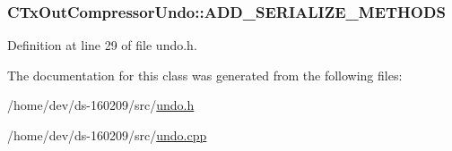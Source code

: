 \subsubsection[{A\+D\+D\+\_\+\+S\+E\+R\+I\+A\+L\+I\+Z\+E\+\_\+\+M\+E\+T\+H\+O\+D\+S}]{\setlength{\rightskip}{0pt plus 5cm}C\+Tx\+Out\+Compressor\+Undo\+::\+A\+D\+D\+\_\+\+S\+E\+R\+I\+A\+L\+I\+Z\+E\+\_\+\+M\+E\+T\+H\+O\+D\+S}\label{class_c_tx_out_compressor_undo_a8519d03067bf052756ad81e022c51c5f}


Definition at line 29 of file undo.\+h.



The documentation for this class was generated from the following files\+:\begin{DoxyCompactItemize}
\item 
/home/dev/ds-\/160209/src/\hyperlink{undo_8h}{undo.\+h}\item 
/home/dev/ds-\/160209/src/\hyperlink{undo_8cpp}{undo.\+cpp}\end{DoxyCompactItemize}
